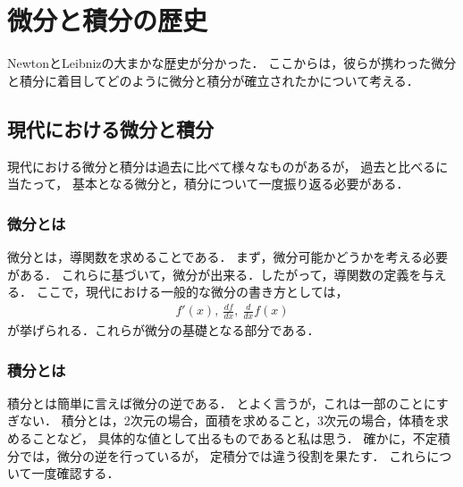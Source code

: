 \documentclass[11pt, a4paper]{jarticle}
\theoremstyle{definition}
\begin{document}
	\section{微分と積分の歴史}
		NewtonとLeibnizの大まかな歴史が分かった．
		ここからは，彼らが携わった微分と積分に着目してどのように微分と積分が確立されたかについて考える．
	
		\subsection{現代における微分と積分}
			現代における微分と積分は過去に比べて様々なものがあるが，
			過去と比べるに当たって，
			基本となる微分と，積分について一度振り返る必要がある．
			
			\subsubsection{微分とは}
				微分とは，導関数を求めることである．
				まず，微分可能かどうかを考える必要がある．
				これらに基づいて，微分が出来る．したがって，導関数の定義を与える．
				ここで，現代における一般的な微分の書き方としては，
				\begin{align*}
					f'(x), \ \frac{df}{dx}, \  \frac{d}{dx} f(x)
				\end{align*}
				が挙げられる．これらが微分の基礎となる部分である．
			
			\subsubsection{積分とは}
				積分とは簡単に言えば微分の逆である．
				とよく言うが，これは一部のことにすぎない．
				積分とは，2次元の場合，面積を求めること，3次元の場合，体積を求めることなど，
				具体的な値として出るものであると私は思う．
				確かに，不定積分では，微分の逆を行っているが，
				定積分では違う役割を果たす．
				これらについて一度確認する．
			
\end{document}
